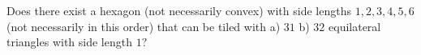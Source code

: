 Does there exist a hexagon (not necessarily convex) with side lengths $1, 2, 3, 4, 5, 6$ (not necessarily in this order) that can be tiled with a) $31$ b) $32$ equilateral triangles with side length $1?$